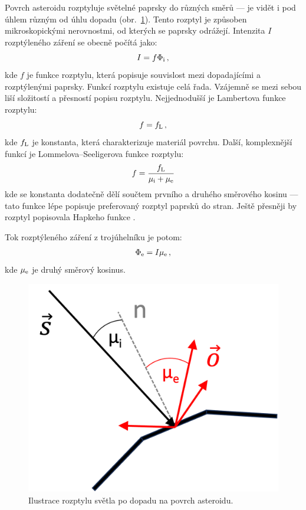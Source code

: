 \documentclass[11pt]{article}
\begin{document}
Povrch asteroidu rozptyluje světelné paprsky do různých směrů --- je vidět i pod úhlem různým od úhlu dopadu (obr.~\ref{dispersion}). Tento rozptyl je způsoben mikroskopickými nerovnostmi, od kterých se paprsky odrážejí. Intenzita $I$ rozptýleného záření se obecně počítá jako:
\begin{equation}
I = f \Phi_{\rm i}\,,
\end{equation}
kde $f$ je funkce rozptylu, která popisuje souvislost mezi dopadajícími a rozptýlenými paprsky. Funkcí rozptylu existuje celá řada. Vzájemně se mezi sebou liší složitostí a přesností popisu rozptylu. Nejjednodušší je Lambertova funkce rozptylu:
\begin{equation}
f = f_{\rm L}\,,
\end{equation}
kde $f_{\rm L}$ je konstanta, která charakterizuje materiál povrchu. Další, komplexnější funkcí je Lommelova--Seeligerova funkce rozptylu: 
\begin{equation}
f = {f_{\rm L}\over\mu_{\rm i}+\mu_{\rm e}}
\end{equation}
kde se konstanta dodatečně dělí součtem prvního a druhého směrového kosinu --- tato funkce lépe popisuje preferovaný rozptyl paprsků do stran. Ještě přesněji by rozptyl popisovala Hapkeho funkce \citep{Hapke_1984Icar...59...41H,Spjuth_2009PhDT.......588S}.

Tok rozptýleného záření z trojúhelníku je potom:
\begin{equation}
\Phi_{\rm e} = I \mu_{\rm e}\,,
\end{equation}
kde $\mu_{\rm e}$ je druhý směrový kosinus.

\begin{figure}[h!]
\includegraphics[scale=0.425]{figs/dispersion.png}
\centering
\caption{Ilustrace rozptylu světla po dopadu na povrch asteroidu.}
\label{dispersion}
\end{figure}
\end{document}
